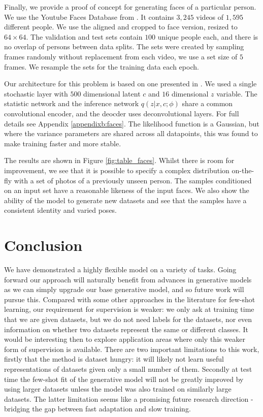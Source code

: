 \documentclass{article} %
\begin{document}
Finally, we provide a proof of concept for generating faces of a particular person. We use the Youtube Faces Database from \citet{youtube_faces}. It contains $3,245$ videos of $1,595$ different people. We use the aligned and cropped to face version, resized to $64 \times 64$. The validation and test sets contain $100$ unique people each, and there is no overlap of persons between data splits. The sets were created by sampling frames randomly without replacement from each video, we use a set size of $5$ frames. We resample the sets for the training data each epoch.

Our architecture for this problem is based on one presented in \cite{discgen}. We used a single stochastic layer with $500$ dimensional latent $c$ and $16$ dimensional $z$ variable. The statistic network and the inference network $q(z | x,c ; \phi)$ share a common convolutional encoder, and the deocder uses deconvolutional layers. For full details see Appendix \ref{appendixb:faces}. The likelihood function is a Gaussian, but where the variance parameters are shared across all datapoints, this was found to make training faster and more stable.

The results are shown in Figure \ref{fig:table_faces}. Whilst there is room for improvement, we see that it is possible to specify a complex distribution on-the-fly with a set of photos of a previously unseen person. The samples conditioned on an input set have a reasonable likeness of the input faces. We also show the ability of the model to generate new datasets and see that the samples have a consistent identity and varied poses. 
\vspace{-1em}
\section{Conclusion}
We have demonstrated a highly flexible model on a variety of tasks. Going forward our approach will naturally benefit from advances in generative models as we can simply upgrade our base generative model, and so future work will pursue this. Compared with some other approaches in the literature for few-shot learning, our requirement for supervision is weaker: we only ask at training time that we are given datasets, but we do not need labels for the datasets, nor even information on whether two datasets represent the same or different classes. It would be interesting then to explore application areas where only this weaker form of supervision is available. There are two important limitations to this work, firstly that the method is dataset hungry: it will likely not learn useful representations of datasets given only a small number of them. Secondly at test time the few-shot fit of the generative model will not be greatly improved by using larger datasets unless the model was also trained on similarly large datasets. The latter limitation seems like a promising future research direction - bridging the gap between fast adaptation and slow training. 
\end{document}
